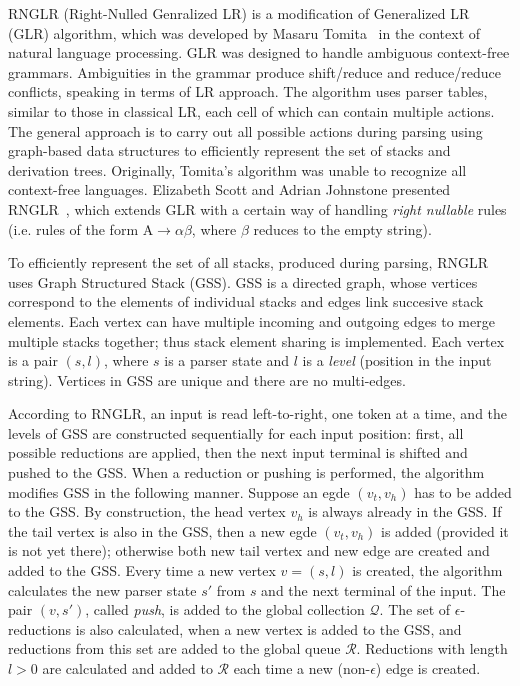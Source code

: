 RNGLR (Right-Nulled Genralized LR) is a modification of Generalized LR (GLR) algorithm, which
was developed by Masaru Tomita~\cite{Tomita} in the context of natural language processing. 
GLR was designed to handle ambiguous context-free grammars. Ambiguities in the grammar produce 
shift/reduce and reduce/reduce conflicts, speaking in terms of LR approach. The algorithm 
uses parser tables, similar to those in classical LR, each cell of which can contain multiple 
actions. The general approach is to carry out all possible actions during parsing 
using graph-based data structures to efficiently represent the set of stacks 
and derivation trees. Originally, Tomita's algorithm was unable to recognize all context-free languages.  
Elizabeth Scott and Adrian Johnstone presented RNGLR~\cite{RNGLR},
which extends GLR with a certain way of handling \emph{right nullable} 
rules (i.e. rules of the form $\mathrm{A} \rightarrow \alpha \beta$, where $\beta$ 
reduces to the empty string).

To efficiently represent the set of all stacks, produced during parsing,
RNGLR uses Graph Structured Stack (GSS). GSS is a directed graph,
whose vertices correspond to the elements of individual stacks and edges link succesive
stack elements. Each vertex can have multiple incoming and outgoing edges to merge 
multiple stacks together; thus stack element sharing is implemented. Each vertex is 
a pair $(s,l)$, where $s$ is a parser state and $l$ is a \emph{level} (position in the input string). 
Vertices in GSS are unique and there are no multi-edges. 

According to RNGLR, an input is read left-to-right, one token at a time, and 
the levels of GSS are constructed sequentially for each input position: first, all  
possible reductions are applied, then the next input terminal is shifted and
pushed to the GSS. When a reduction or pushing is performed, 
the algorithm modifies GSS in the following manner. Suppose an 
egde $(v_t,v_h)$ has to be added to the GSS. By construction, the head vertex
$v_h$ is always already in the GSS. If the tail vertex is also in the GSS, then
a new egde $(v_t,v_h)$ is added (provided it is not yet there); otherwise both 
new tail vertex and new edge are created and added to the GSS. Every time a new 
vertex $v=(s,l)$ is created, the algorithm calculates the new parser 
state $s'$ from $s$ and the next terminal of the input. The pair $(v,s')$, called 
\emph{push}, is added to the global collection $\mathcal{Q}$. The set of $\epsilon$-reductions 
is also calculated, when a new vertex is added to the GSS, and reductions from this set are added to the 
global queue $\mathcal{R}$. Reductions with length $l>0$ are calculated and added to $\mathcal{R}$ 
each time a new (non-$\epsilon$) edge is created. 

